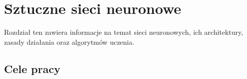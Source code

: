 \chapter{Sztuczne sieci neuronowe}
\label{cha:sztuczne_sieci_neuronowe}

Rozdział ten zawiera informacje na temat sieci neuronowych, ich architektury, zasady działania oraz algorytmów uczenia.

\section{Cele pracy}
\label{sec:celePracy}


